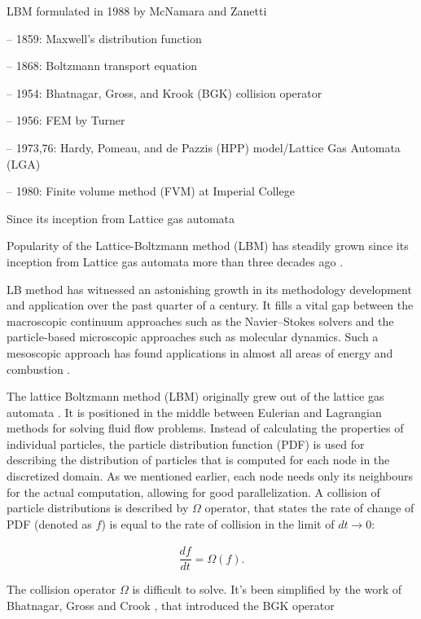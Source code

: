 LBM	formulated in 1988 by	McNamara and	Zanetti

– 1859:	Maxwell's	distribution	function	

– 1868:	Boltzmann	transport	equation	

– 1954:	Bhatnagar,	Gross,	and	Krook	(BGK)	collision	operator	

– 1956:	FEM	by	Turner	

– 1973,76:	Hardy,	Pomeau,	and	de	Pazzis	(HPP)	model/Lattice	
Gas	Automata	(LGA)	

– 1980:	Finite	volume	method	(FVM)	at	Imperial	College	


Since its inception from Lattice gas automata

Popularity of the Lattice-Boltzmann method (LBM) has steadily grown since its inception from Lattice gas automata more than three decades ago \citep{Hardy1973, frischLatticeGasAutomataNavierStokes1986}.

LB method has witnessed an astonishing growth in its methodology development and application over the past quarter of a century. It fills a vital gap between the macroscopic continuum approaches such as the Navier–Stokes solvers and the particle-based microscopic approaches such as molecular dynamics. Such a mesoscopic approach has found applications in almost all areas of energy and combustion \cite{liLatticeBoltzmannMethods2016a}.

The lattice Boltzmann method (LBM) originally grew out of the lattice gas automata \cite{succi2001lattice}. It is positioned in the middle between Eulerian and Lagrangian methods for solving fluid flow problems. Instead of calculating the properties of individual particles, the particle distribution function (PDF) is used for describing the distribution of particles that is computed for each node in the discretized domain. As we mentioned earlier, each node needs only its neighbours for the actual computation, allowing for good parallelization. A collision of particle distributions is described by $\Omega$ operator, that states the rate of change of PDF (denoted as $f$) is equal to the rate of collision in the limit of $dt \xrightarrow[]{} 0$:

\begin{equation}
	\label{eq:collision-operator}
	\frac{df}{dt} = \Omega(f).
\end{equation}

The collision operator $\Omega$ is difficult to solve. It's been simplified by the work of Bhatnagar, Gross and Crook \cite{bhatnagarModelCollisionProcesses1954}, that introduced the BGK operator

